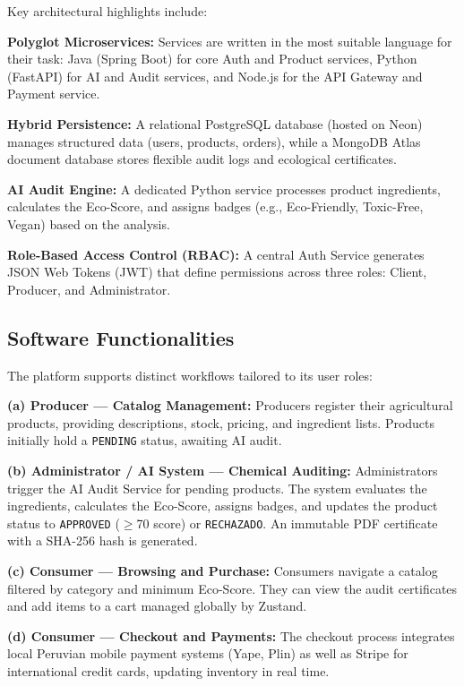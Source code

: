 \documentclass[preprint,12pt,a4paper]{elsarticle}
\begin{document}
Key architectural highlights include:

\textbf{Polyglot Microservices:} Services are written in the most suitable language for their task: Java (Spring Boot) for core Auth and Product services, Python (FastAPI) for AI and Audit services, and Node.js for the API Gateway and Payment service.

\textbf{Hybrid Persistence:} A relational PostgreSQL database (hosted on Neon) manages structured data (users, products, orders), while a MongoDB Atlas document database stores flexible audit logs and ecological certificates.

\textbf{AI Audit Engine:} A dedicated Python service processes product ingredients, calculates the Eco-Score, and assigns badges (e.g., Eco-Friendly, Toxic-Free, Vegan) based on the analysis.

\textbf{Role-Based Access Control (RBAC):} A central Auth Service generates JSON Web Tokens (JWT) that define permissions across three roles: Client, Producer, and Administrator.

\subsection{Software Functionalities}

The platform supports distinct workflows tailored to its user roles:

\textbf{(a) Producer --- Catalog Management:} Producers register their agricultural products, providing descriptions, stock, pricing, and ingredient lists. Products initially hold a \texttt{PENDING} status, awaiting AI audit.

\textbf{(b) Administrator / AI System --- Chemical Auditing:} Administrators trigger the AI Audit Service for pending products. The system evaluates the ingredients, calculates the Eco-Score, assigns badges, and updates the product status to \texttt{APPROVED} ($\geq$70 score) or \texttt{RECHAZADO}. An immutable PDF certificate with a SHA-256 hash is generated.

\textbf{(c) Consumer --- Browsing and Purchase:} Consumers navigate a catalog filtered by category and minimum Eco-Score. They can view the audit certificates and add items to a cart managed globally by Zustand.

\textbf{(d) Consumer --- Checkout and Payments:} The checkout process integrates local Peruvian mobile payment systems (Yape, Plin) as well as Stripe for international credit cards, updating inventory in real time.
\end{document}
